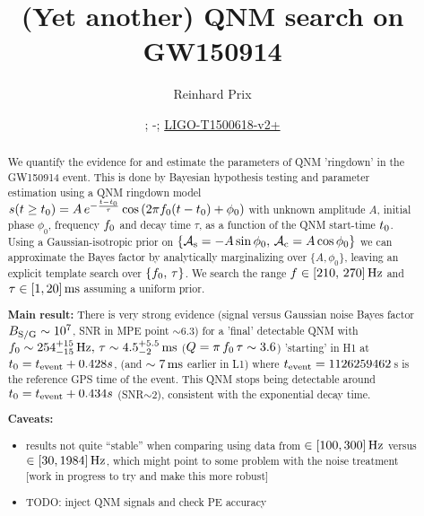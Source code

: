 \documentclass[aps,prd,onecolumn,notitlepage,nofootinbib,superscriptaddress,altaffilletter,floatfix]{revtex4-1}
\newcommand{\dcc}{LIGO-T1500618-v2+}
\begin{document}
\title{(Yet another) QNM search on GW150914}


\author{Reinhard Prix}
\date{\commitDATE; \commitIDshort-\commitSTATUS; \href{https://dcc.ligo.org/LIGO-T1500618}{\dcc}}


\begin{abstract}
  We quantify the evidence for and estimate the parameters of QNM 'ringdown' in the GW150914 event.
  This is done by Bayesian hypothesis testing and parameter estimation using a QNM ringdown model
  $s(t\ge t_0) = A\,e^{-\frac{t-t_0}{\tau}}\cos\left(2\pi f_0 (t-t_0) + \phi_0\right)$ with unknown amplitude $A$, initial phase $\phi_0$,
  frequency $f_0$ and decay time $\tau$, as a function of the QNM start-time $t_0$.
  Using a Gaussian-isotropic prior on $\{\mathcal{A}_{\mathrm{s}}=-A\sin\phi_0,\,\mathcal{A}_{\mathrm{c}}=A\cos\phi_0\}$ we can approximate the Bayes factor by analytically marginalizing over
  $\{A,\phi_0\}$, leaving an explicit template search over $\{f_0,\,\tau\}$. We search the range $f\in[210,\,270]\,\mathrm{Hz}$ and $\tau \in [1, 20]\,\mathrm{ms}$
  assuming a uniform prior.

  \textbf{Main result:}
  There is very strong evidence (signal versus Gaussian noise Bayes factor $B_{\mathrm{S/G}}\sim10^{7}$, SNR in MPE point $\sim6.3$) for a 'final' detectable QNM
  with $f_0\sim254^{+15}_{-15}\,\mathrm{Hz},\,\tau\sim4.5^{+5.5}_{-2}\,\mathrm{ms}$ ($Q = \pi\,f_0\,\tau \sim 3.6$) 'starting' in H1 at $t_0 = t_{\mathrm{event}} + 0.428s$, (and $\sim7\,\mathrm{ms}$ earlier in L1)
  where $t_{\mathrm{event}} = 1126259462\,$s is the reference GPS time of the event.
  This QNM stops being detectable around $t_0 = t_{\mathrm{event}}+0.434s$ (SNR$\sim2$), consistent with the exponential decay time.

  \textbf{Caveats:}
  \begin{itemize}
  \item results not quite ``stable'' when comparing using data from $\in[100,300]\,\mathrm{Hz}$ versus $\in[30,1984]\,\mathrm{Hz}$, which might point to some problem
    with the noise treatment [work in progress to try and make this more robust]
  \item TODO: inject QNM signals and check PE accuracy
  \end{itemize}
\end{abstract}
\end{document}
